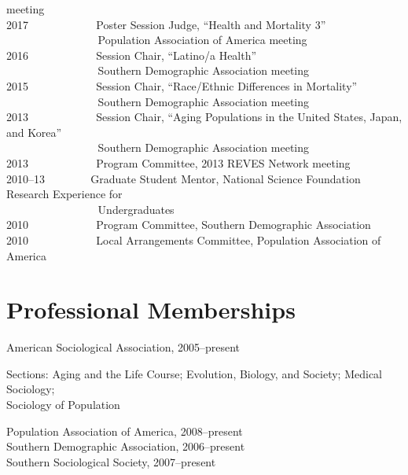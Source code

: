 \documentclass[11pt,]{article}
\begin{document}
meeting\\
2017 ~ ~ ~ ~ ~ ~ ~ Poster Session Judge, ``Health and Mortality 3''\\
\hspace*{0.333em} ~ ~ ~ ~ ~ ~ ~ ~ ~ ~ Population Association of America
meeting\\
2016 ~ ~ ~ ~ ~ ~ ~ Session Chair, ``Latino/a Health''\\
\hspace*{0.333em} ~ ~ ~ ~ ~ ~ ~ ~ ~ ~ Southern Demographic Association
meeting\\
2015 ~ ~ ~ ~ ~ ~ ~ Session Chair, ``Race/Ethnic Differences in
Mortality''\\
\hspace*{0.333em} ~ ~ ~ ~ ~ ~ ~ ~ ~ ~ Southern Demographic Association
meeting\\
2013 ~ ~ ~ ~ ~ ~ ~ Session Chair, ``Aging Populations in the United
States, Japan, and Korea''\\
\hspace*{0.333em} ~ ~ ~ ~ ~ ~ ~ ~ ~ ~ Southern Demographic Association
meeting\\
2013 ~ ~ ~ ~ ~ ~ ~ Program Committee, 2013 REVES Network meeting\\
2010--13 ~ ~ ~ ~ ~Graduate Student Mentor, National Science Foundation
Research Experience for\\
\hspace*{0.333em} ~ ~ ~ ~ ~ ~ ~ ~ ~ ~ Undergraduates\\
2010 ~ ~ ~ ~ ~ ~ ~ Program Committee, Southern Demographic Association\\
2010 ~ ~ ~ ~ ~ ~ ~ Local Arrangements Committee, Population Association
of America

\hypertarget{professional-memberships}{%
\section{Professional Memberships}\label{professional-memberships}}

American Sociological Association, 2005--present

\setlength{\leftskip}{1cm}

Sections: Aging and the Life Course; Evolution, Biology, and Society;
Medical Sociology;\\
Sociology of Population

\setlength{\leftskip}{0pt}

Population Association of America, 2008--present\\
Southern Demographic Association, 2006--present\\
Southern Sociological Society, 2007--present
\end{document}
